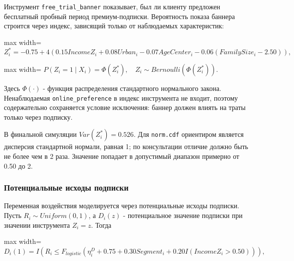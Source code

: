 \documentclass[11pt]{article}
\begin{document}
Инструмент \texttt{free\_trial\_banner} показывает, был ли клиенту
предложен бесплатный пробный период премиум-подписки. Вероятность показа
баннера строится через индекс, зависящий только от наблюдаемых
характеристик:

\begin{center}
\begin{adjustbox}{max width=\linewidth}
\(\displaystyle Z_i^* = -0.75 + 4\left(0.15 IncomeZ_i + 0.08 Urban_i - 0.07 AgeCenter_i - 0.06(FamilySize_i - 2.50)\right),\)
\end{adjustbox}
\end{center}

\begin{center}
\begin{adjustbox}{max width=\linewidth}
\(\displaystyle P(Z_i = 1 \mid X_i) = \Phi(Z_i^*), \quad Z_i \sim Bernoulli(\Phi(Z_i^*)).\)
\end{adjustbox}
\end{center}

Здесь \(\Phi(\cdot)\) - функция распределения стандартного нормального
закона. Ненаблюдаемая \texttt{online\_preference} в индекс инструмента
не входит, поэтому содержательно сохраняется условие исключения: баннер
должен влиять на траты только через подписку.

В финальной симуляции \(Var(Z_i^*) = 0.526\). Для \texttt{norm.cdf}
ориентиром является дисперсия стандартной нормали, равная 1; по
консультации отличие должно быть не более чем в 2 раза. Значение
попадает в допустимый диапазон примерно от 0.50 до 2.

\subsubsection{Потенциальные исходы
подписки}\label{ux43fux43eux442ux435ux43dux446ux438ux430ux43bux44cux43dux44bux435-ux438ux441ux445ux43eux434ux44b-ux43fux43eux434ux43fux438ux441ux43aux438}

Переменная воздействия моделируется через потенциальные исходы подписки.
Пусть \(R_i \sim Uniform(0,1)\), а \(D_i(z)\) - потенциальное значение
подписки при значении инструмента \(Z_i=z\). Тогда

\begin{center}
\begin{adjustbox}{max width=\linewidth}
\(\displaystyle D_i(1) = I\left(R_i \leq F_{logistic}(\eta_i^D + 0.75 + 0.30 Segment_i + 0.20 I(IncomeZ_i > 0.50))\right),\)
\end{adjustbox}
\end{center}
\end{document}
